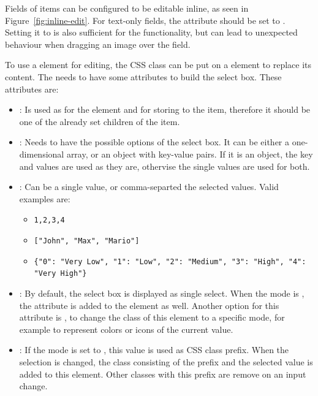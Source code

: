 Fields of items can be configured to be editable inline, as seen in
Figure~\ref{fig:inline-edit}. For text-only fields, the
 attribute \parencite{mdn-contenteditable} should
be set to . Setting it to  is also
sufficient for the functionality, but can lead to unexpected behaviour
when dragging an image over the field.

To use a  element for editing, the CSS class
 can be put on a  element to replace its
content. The  needs to have some  attributes
to build the select box. These attributes are:
\begin{itemize}
  \item {}: Is used as  for the
     element and for storing to the item, therefore it
    should be one of the already set children of the item.

  \item {}: Needs to have the possible options of the
    select box. It can be either a one-dimensional array, or an object
    with key-value pairs. If it is an object, the key and values are
    used as they are, othervise the single values are used for both.

  \item {}: Can be a single value, or comma-separted
    the selected values. Valid examples are:
    \begin{itemize}
      \item \lstinline!1,2,3,4!
      \item \lstinline!["John", "Max", "Mario"]!
      \item \lstinline!{"0": "Very Low", "1": "Low", "2": "Medium", "3": "High", "4": "Very High"}!
    \end{itemize}
  
  \item {}: By default, the select box is displayed as
    single select. When the mode is , the
     attribute is added to the  element
    as well. Another option for this attribute is , to
    change the class of this element to a specific mode, for example to
    represent colors or icons of the current value.
  
  \item {}: If the mode is set to , this
    value is used as CSS class prefix. When the selection is changed,
    the class consisting of the prefix and the selected value is added
    to this element. Other classes with this prefix are remove on an
    input change.
\end{itemize}







